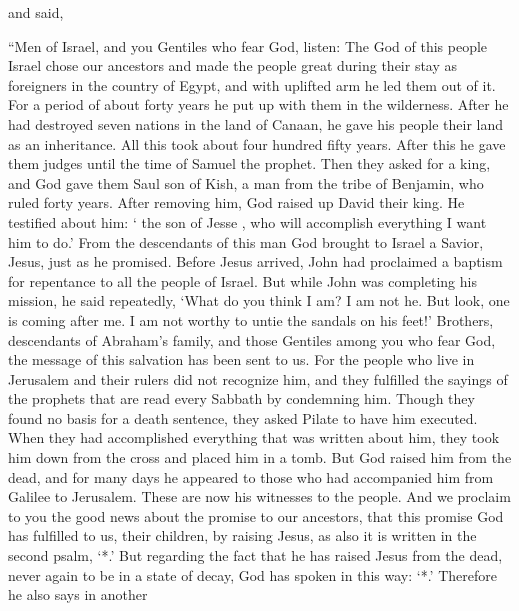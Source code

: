 {and said,
\par }{\PP “Men
of Israel,
and
you Gentiles who fear
God,
listen:
The God
of this
people
Israel
chose
our
ancestors
and
made
the people
great
during
their stay as foreigners
in
the country
of Egypt,
and
with
uplifted
arm
he led
them
out of
it.
For a period
of about
forty years
he put up
with them
in
the wilderness.
After
he had destroyed
seven
nations
in
the land
of Canaan,
he gave
his people their
land
as an inheritance.
All this took about four hundred
fifty
years.
After
this
he gave
them judges
until
the time of Samuel
the prophet.
Then
they asked
for a king,
and
God
gave
them
Saul
son
of Kish,
a man
from
the tribe
of Benjamin,
who ruled forty
years.
After removing
him,
God raised up
David
their
king.
He testified
about him: ‘{}
the son of Jesse
{}, who
will accomplish
everything
I
want him to do.’
From
the descendants
of this
man God
brought
to Israel
a Savior,
Jesus,
just as he promised.
Before
Jesus
arrived,
John
had proclaimed
a baptism
for repentance
to all
the people
of Israel.
But
while John
was completing
his mission,
he said repeatedly, ‘What
do you think
I am? I
am not
he. But
look,
one is coming
after
me.
I am
not
worthy
to untie
the sandals
on his feet!’
Brothers,
descendants
of Abraham’s
family,
and
those Gentiles among
you
who fear
God,
the message
of this
salvation
has been sent
to us.
For
the people who live
in
Jerusalem
and
their
rulers
did not recognize
him, and
they fulfilled
the sayings
of the prophets
that are read
every
Sabbath
by condemning him.
Though
they found
no
basis
for a death sentence,
they asked
Pilate
to have
him
executed.
When
they had accomplished
everything
that was written
about
him,
they took
him down
from
the cross
and placed
him in
a tomb.
But
God
raised
him
from
the dead,
and for many
days
he appeared
to those who had accompanied
him
from
Galilee
to
Jerusalem.
These
are
now
his
witnesses
to
the people.
And
we
proclaim
to you
the good news
about
the promise
to our ancestors,
that this promise God has fulfilled to us, their children, by raising Jesus, as
also
it is written
in
the second
psalm, ‘{}*.’
But
regarding the fact that
he has raised
Jesus
from
the dead,
never again
to be
in a state
of
decay,
God has spoken
in this way: ‘{}*.’
Therefore
he
also
says
in
another
}
